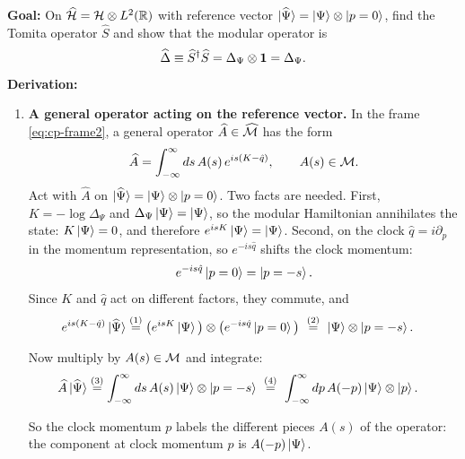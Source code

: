 \begin{keyresult}
\textbf{Goal:} On $\widehat{\mathcal{H}} = \mathcal{H} \otimes L^2(\mathbb{R})$ with reference vector $\ket{\widehat\Psi} = \ket\Psi \otimes \ket{p=0}$, find the Tomita operator $\widehat S$ and show that the modular operator is
\[
\widehat\Delta \equiv \widehat S^\dagger \widehat S = \Delta_\Psi \otimes \mathbf{1} = \Delta_\Psi .
\]
\textbf{Derivation:}
\begin{enumerate}[leftmargin=*]
\item \textbf{A general operator acting on the reference vector.}
In the frame \eqref{eq:cp-frame2}, a general operator $\widehat A \in \widehat{\mathcal{M}}$ has the form
\[
\widehat A = \int_{-\infty}^\infty ds \, A(s) \, e^{is(K - \hat q)}, \qquad A(s) \in \mathcal{M} .
\]
Act with $\widehat A$ on $\ket{\widehat\Psi} = \ket\Psi \otimes \ket{p=0}$. Two facts are needed. First, $K = -\log\Delta_\Psi$ and $\Delta_\Psi\ket\Psi = \ket\Psi$, so the modular Hamiltonian annihilates the state: $K\ket\Psi = 0$, and therefore $e^{is K}\ket\Psi = \ket\Psi$. Second, on the clock $\hat q = i\partial_p$ in the momentum representation, so $e^{-is\hat q}$ shifts the clock momentum:
\[
e^{-is\hat q}\ket{p=0} = \ket{p = -s} .
\]
Since $K$ and $\hat q$ act on different factors, they commute, and
\begin{align}
e^{is(K - \hat q)}\ket{\widehat\Psi}
&\overset{(1)}{=} \big(e^{is K}\ket\Psi\big) \otimes \big(e^{-is\hat q}\ket{p=0}\big)
\ \overset{(2)}{=}\ \ket\Psi \otimes \ket{p = -s} . \notag
\end{align}
\quad
{}

Now multiply by $A(s) \in \mathcal{M}$ and integrate:
\begin{align}
\widehat A \ket{\widehat\Psi}
&\overset{(3)}{=} \int_{-\infty}^\infty ds \, A(s)\ket\Psi \otimes \ket{p = -s}
\ \overset{(4)}{=}\ \int_{-\infty}^\infty dp \, A(-p)\ket\Psi \otimes \ket{p} . \notag
\end{align}
\quad
{}

So the clock momentum $p$ labels the different pieces $A(s)$ of the operator: the component at clock momentum
$p$ is $A(-p)\ket\Psi$.


\end{enumerate}
\end{keyresult}
